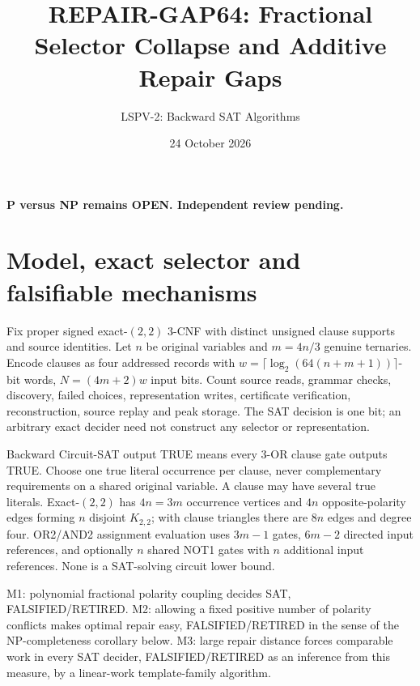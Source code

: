 \documentclass[11pt]{article}
\title{REPAIR-GAP64: Fractional Selector Collapse and Additive Repair Gaps}
\author{LSPV-2: Backward SAT Algorithms}
\date{24 October 2026}
\begin{document}
\maketitle
\begin{center}\textbf{P versus NP remains OPEN. Independent review pending.}\end{center}

\section{Model, exact selector and falsifiable mechanisms}
Fix proper signed exact-$(2,2)$ 3-CNF with distinct unsigned clause supports and source identities. Let $n$ be original variables and $m=4n/3$ genuine ternaries. Encode clauses as four addressed records with $w=\lceil\log_2(64(n+m+1))\rceil$-bit words, $N=(4m+2)w$ input bits. Count source reads, grammar checks, discovery, failed choices, representation writes, certificate verification, reconstruction, source replay and peak storage. The SAT decision is one bit; an arbitrary exact decider need not construct any selector or representation.

Backward Circuit-SAT output TRUE means every 3-OR clause gate outputs TRUE. Choose one true literal occurrence per clause, never complementary requirements on a shared original variable. A clause may have several true literals. Exact-$(2,2)$ has $4n=3m$ occurrence vertices and $4n$ opposite-polarity edges forming $n$ disjoint $K_{2,2}$; with clause triangles there are $8n$ edges and degree four. OR2/AND2 assignment evaluation uses $3m-1$ gates, $6m-2$ directed input references, and optionally $n$ shared NOT1 gates with $n$ additional input references. None is a SAT-solving circuit lower bound.

M1: polynomial fractional polarity coupling decides SAT, FALSIFIED/RETIRED. M2: allowing a fixed positive number of polarity conflicts makes optimal repair easy, FALSIFIED/RETIRED in the sense of the NP-completeness corollary below. M3: large repair distance forces comparable work in every SAT decider, FALSIFIED/RETIRED as an inference from this measure, by a linear-work template-family algorithm.
\end{document}
